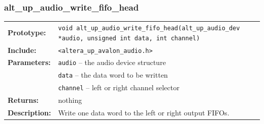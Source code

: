 \subsubsection{alt\_up\_audio\_write\_fifo\_head}
\begin{tabular}[ht]{lp{11cm}}
	\textbf{Prototype:}
	&
	\texttt{void alt\_up\_audio\_write\_fifo\_head(alt\_up\_audio\_dev *audio, unsigned int data, int channel)} 
	\\
	\textbf{Include:}
	&
	{\tt <altera\_up\_avalon\_audio.h>}
	\\
	{\textbf{Parameters:}}
	&
	\texttt{{audio}}
	 -- the audio device structure 
	\\
	&
	\texttt{{data}}
	 -- the data word to be written 
	\\
	&
	\texttt{{channel}}
	 -- left or right channel selector 
	\\
	\textbf{Returns:}
	& nothing
	\\
	\textbf{Description:}
	& Write one data word to the left or right output FIFOs.\\
\end{tabular}
\vfill

